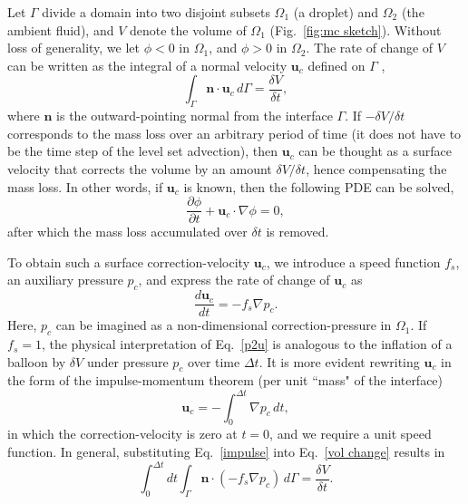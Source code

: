 Let $\Gamma$ divide a domain into two disjoint subsets $\Omega_1$ (\eg a droplet) and $\Omega_2$ (\eg the ambient fluid), and $V$ denote the volume of $\Omega_1$ (Fig.\ \ref{fig:mc sketch}). Without loss of generality, we let $\phi < 0 $ in $\Omega_1$, and $\phi > 0 $ in $\Omega_2$. The rate of change of $V$ can be written as the integral of a normal velocity ${\bm u}_c$ defined on $\Gamma$ \citep{Salac_CPC_2016}, \ie
\begin{equation}
    \int_\Gamma {\bm n} \cdot {\bm u}_c \,d\Gamma = \frac{\delta V}{\delta t},
  \label{vol change}
\end{equation}
where ${\bm n}$ is the outward-pointing normal from the interface $\Gamma$. If $-\delta V/\delta t$ corresponds to the mass loss over an arbitrary period of time (it does not have to be the time step of the level set advection), then ${\bm u}_c$ can be thought as a surface velocity that corrects the volume by an amount $\delta V/\delta t$, hence compensating the mass loss. In other words, if ${\bm u}_c$ is known, then the following PDE can be solved,
\begin{equation}
  \frac{\partial \phi}{\partial t} + {\bm u}_c \cdot \nabla \phi = 0,
  \label{inflation}
\end{equation}
after which the mass loss accumulated over $\delta t$ is removed.

To obtain such a surface correction-velocity ${\bm u}_c$, we introduce a speed function $f_s$, an auxiliary pressure $p_c$, and express the rate of change of ${\bm u}_c$ as
\begin{equation}
    \frac{d{\bm u}_c}{dt} = - f_s \nabla p_c.
  \label{p2u}
\end{equation}
Here, $p_c$ can be imagined as a non-dimensional correction-pressure in $\Omega_1$. If $f_s=1$, the physical interpretation of Eq.\ \eqref{p2u} is analogous to the inflation of a balloon by $\delta V$ under pressure $p_c$ over time $\Delta t$. It is more evident rewriting ${\bm u}_c$ in the form of the impulse-momentum theorem (per unit ``mass" of the interface)
\begin{equation}
    {\bm u}_c = -\int_{0}^{\Delta t} \nabla p_c \,dt,
  \label{impulse}
\end{equation}
in which the correction-velocity is zero at $t=0$, and we require a unit speed function. In general, substituting Eq.\ \eqref{impulse} into Eq.\ \eqref{vol change} results in
\begin{equation}
    \int_0^{\Delta t}dt \int_\Gamma {\bm n} \cdot (-f_s \nabla p_c) \,d\Gamma = \frac{\delta V}{\delta t}.
  \label{ICLS 1}
\end{equation}

